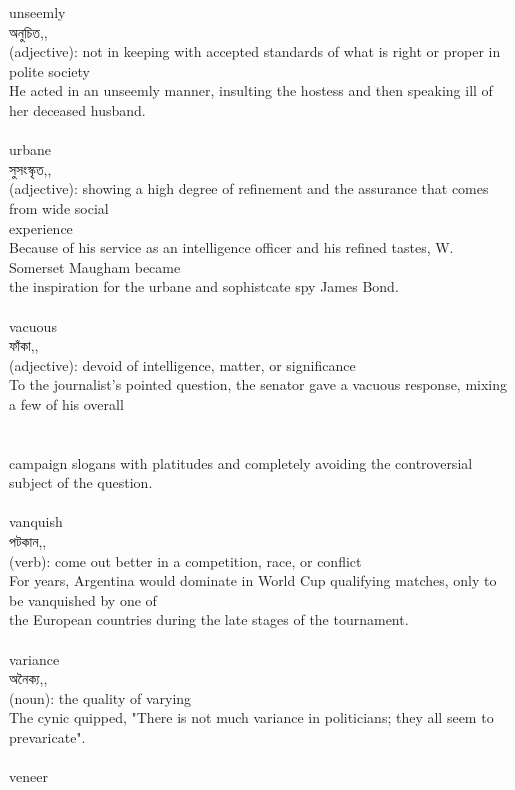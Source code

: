 \documentclass{article}
\begin{document}
{unseemly}\\
{অনুচিত,,}\\
{(adjective): not in keeping with accepted standards of what is right or proper in polite society\\He acted in an unseemly manner, insulting the hostess and then speaking ill of her deceased husband.\\}\\
{urbane}\\
{সুসংস্কৃত,,}\\
{(adjective): showing a high degree of refinement and the assurance that comes from wide social\\experience\\Because of his service as an intelligence officer and his refined tastes, W. Somerset Maugham became\\the inspiration for the urbane and sophistcate spy James Bond.\\}\\
{vacuous}\\
{ফাঁকা,,}\\
{(adjective): devoid of intelligence, matter, or significance\\To the journalist's pointed question, the senator gave a vacuous response, mixing a few of his overall\\\\                                                                                \\campaign slogans with platitudes and completely avoiding the controversial subject of the question.\\}\\
{vanquish}\\
{পটকান,,}\\
{(verb): come out better in a competition, race, or conflict\\For years, Argentina would dominate in World Cup qualifying matches, only to be vanquished by one of\\the European countries during the late stages of the tournament.\\}\\
{variance}\\
{অনৈক্য,,}\\
{(noun): the quality of varying\\The cynic quipped, "There is not much variance in politicians; they all seem to prevaricate".\\}\\
{veneer}\\
\end{document}

